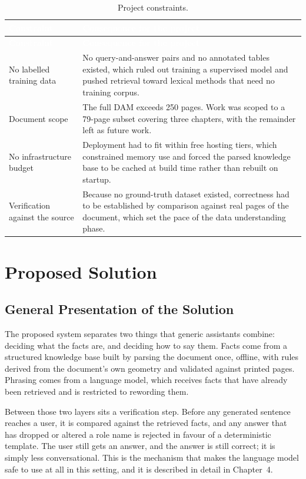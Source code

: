 \begin{longtable}{|p{}|p{}|}
\caption{Project constraints.}\label{tab:constraints}\\
\hline
\rowcolor{myblue}\textcolor{white}{\textbf{Constraint}} & \textcolor{white}{\textbf{Consequence for the project}} \\
\hline
\endfirsthead
\hline
\rowcolor{myblue}\textcolor{white}{\textbf{Constraint}} & \textcolor{white}{\textbf{Consequence for the project}} \\
\hline
\endhead
No labelled training data & No query-and-answer pairs and no annotated tables existed, which ruled out training a supervised model and pushed retrieval toward lexical methods that need no training corpus. \\ \hline
Document scope & The full DAM exceeds 250 pages. Work was scoped to a 79-page subset covering three chapters, with the remainder left as future work. \\ \hline
No infrastructure budget & Deployment had to fit within free hosting tiers, which constrained memory use and forced the parsed knowledge base to be cached at build time rather than rebuilt on startup. \\ \hline
Verification against the source & Because no ground-truth dataset existed, correctness had to be established by comparison against real pages of the document, which set the pace of the data understanding phase. \\ \hline
\end{longtable}

\section{Proposed Solution}

\subsection{General Presentation of the Solution}

The proposed system separates two things that generic assistants combine: deciding what the facts are, and deciding how to say them. Facts come from a structured knowledge base built by parsing the document once, offline, with rules derived from the document's own geometry and validated against printed pages. Phrasing comes from a language model, which receives facts that have already been retrieved and is restricted to rewording them.

Between those two layers sits a verification step. Before any generated sentence reaches a user, it is compared against the retrieved facts, and any answer that has dropped or altered a role name is rejected in favour of a deterministic template. The user still gets an answer, and the answer is still correct; it is simply less conversational. This is the mechanism that makes the language model safe to use at all in this setting, and it is described in detail in Chapter~4.

